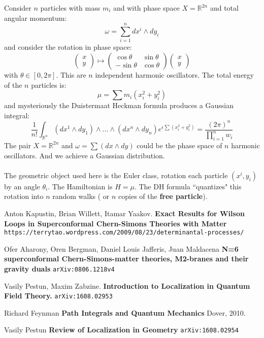 \documentclass[12pt]{article}
\begin{document}
\noindent Consider $n$ particles with mass $m_i$ and with phase space $X = \mathbb{R}^{2n}$ and total angular momentum:
$$ \omega = \sum_{i=1}^n dx^i \wedge dy_i $$
and consider the rotation in phase space:
$$ \left(\begin{array}{c} x \\ y \end{array} \right) \mapsto \left( \begin{array}{cc}
\cos \theta & \sin \theta \\ 
-\sin \theta & \cos \theta  \end{array}\right) \left(\begin{array}{c} x \\ y \end{array} \right)$$
with $\theta \in [0, 2\pi]$.  This are $n$ independent harmonic oscillators.  The total energy of the $n$ particles is:
$$ \mu = \sum m_i (x_i^2 + y_i^2) $$
and mysteriously the Duistermaat Heckman formula produces a Gaussian integral:
$$ \frac{1}{n!} \int_{\mathbb{R}^n}
(dx^1 \wedge dy_1)\wedge
\dots \wedge
(dx^n \wedge dy_n) e^{\epsilon \sum (x_i^2 + y_i^2)}
= \frac{(2\pi)^n}{\prod_{i=1}^n w_i}
 $$
The pair $X = \mathbb{R}^{2n}$ and $\omega = \sum (dx \wedge dy)$ could be the phase space of $n$ harmonic oscillators.  And we achieve a Gaussian distribution.  \\ \\
The geometric object used here is the Euler class, rotation each particle $(x^i, y_i)$ by an angle $\theta_i$.  The Hamiltonian is $H = \mu$.  The DH formula ``quantizes" this rotation into $n$ random walks ( or $n$ copies of the \textbf{free particle}).

\newpage

\selectfont \fontsize{12}{10}\selectfont

\begin{thebibliography}{}


\item Anton Kapustin, Brian Willett, Itamar Yaakov.  \textbf{Exact Results for Wilson Loops in Superconformal Chern-Simons Theories with Matter } \\ \texttt{https://terrytao.wordpress.com/2009/08/23/determinantal-processes/}

\item Ofer Aharony, Oren Bergman, Daniel Louis Jafferis, Juan Maldacena \textbf{N=6 superconformal Chern-Simons-matter theories, M2-branes and their gravity duals}
\texttt{arXiv:0806.1218v4}

\item Vasily Pestun, Maxim Zabzine. \textbf{Introduction to Localization in Quantum Field Theory.} \texttt{arXiv:1608.02953}

\item Richard Feynman \textbf{Path Integrals and Quantum Mechanics} Dover, 2010.

\item Vasily Pestun \textbf{Review of Localization in Geometry} \texttt{arXiv:1608.02954}


\end{thebibliography}
\end{document}
